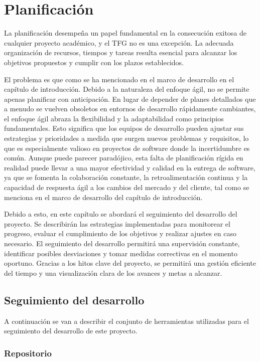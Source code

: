 \chapter{Planificación}

La planificación desempeña un papel fundamental en la consecución exitosa de cualquier proyecto académico, y el TFG no es una excepción. La adecuada organización de recursos, tiempos y tareas resulta esencial para alcanzar los objetivos propuestos y cumplir con los plazos establecidos.

El problema es que como se ha mencionado en el marco de desarrollo en el capítulo de introducción. Debido a la naturaleza del enfoque ágil, no se permite apenas planificar con anticipación. En lugar de depender de planes detallados que a menudo se vuelven obsoletos en entornos de desarrollo rápidamente cambiantes, el enfoque ágil abraza la flexibilidad y la adaptabilidad como principios fundamentales. Esto significa que los equipos de desarrollo pueden ajustar sus estrategias y prioridades a medida que surgen nuevos problemas y requisitos, lo que es especialmente valioso en proyectos de software donde la incertidumbre es común. Aunque puede parecer paradójico, esta falta de planificación rígida en realidad puede llevar a una mayor efectividad y calidad en la entrega de software, ya que se fomenta la colaboración constante, la retroalimentación continua y la capacidad de respuesta ágil a los cambios del mercado y del cliente, tal como se menciona en el marco de desarrollo del capítulo de introducción.

Debido a esto, en este capítulo se abordará el seguimiento del desarrollo del proyecto. Se describirán las estrategias implementadas para monitorear el progreso, evaluar el cumplimiento de los objetivos y realizar ajustes en caso necesario. El seguimiento del desarrollo permitirá una supervisión constante, identificar posibles desviaciones y tomar medidas correctivas en el momento oportuno. Gracias a los hitos clave del proyecto, se permitirá una gestión eficiente del tiempo y una visualización clara de los avances y metas a alcanzar.

\section{Seguimiento del desarrollo}

A continuación se van a describir el conjunto de herramientas utilizadas para el seguimiento del desarrollo de este proyecto.


\subsection{Repositorio}

